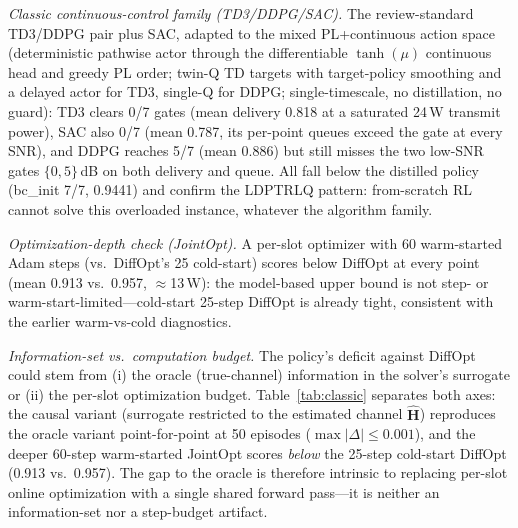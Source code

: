 \documentclass[journal]{IEEEtran}
\newcommand{\vect}[1]{\mathbf{#1}}
\begin{document}
\emph{Classic continuous-control family (TD3/DDPG/SAC).} The review-standard
TD3/DDPG pair plus SAC, adapted to the mixed PL+continuous action space
(deterministic pathwise actor through the differentiable $\tanh(\mu)$ continuous
head and greedy PL order; twin-Q TD targets with target-policy smoothing and a
delayed actor for TD3, single-Q for DDPG; single-timescale, no distillation, no
guard): TD3 clears 0/7 gates (mean delivery 0.818 at a saturated 24\,W transmit
power), SAC also 0/7 (mean 0.787, its per-point queues exceed the gate at every
SNR), and DDPG reaches 5/7 (mean 0.886) but still misses the two low-SNR gates
$\{0,5\}$\,dB on both delivery and queue. All fall below the distilled policy
(bc\_init 7/7, 0.9441) and confirm the LDPTRLQ pattern: from-scratch RL cannot
solve this overloaded instance, whatever the algorithm family.

\emph{Optimization-depth check (JointOpt).} A per-slot optimizer with 60
warm-started Adam steps (vs.\ DiffOpt's 25 cold-start) scores below DiffOpt at
every point (mean 0.913 vs.\ 0.957, $\approx$13\,W): the model-based upper bound
is not step- or warm-start-limited---cold-start 25-step DiffOpt is already tight,
consistent with the earlier warm-vs-cold diagnostics.

\emph{Information-set vs.\ computation budget.} The policy's deficit against
DiffOpt could stem from (i) the oracle (true-channel) information in the solver's
surrogate or (ii) the per-slot optimization budget. Table~\ref{tab:classic}
separates both axes: the causal variant (surrogate restricted to the estimated
channel $\hat{\vect{H}}$) reproduces the oracle variant point-for-point at 50
episodes ($\max|\Delta|\le 0.001$), and the deeper 60-step warm-started JointOpt
scores \emph{below} the 25-step cold-start DiffOpt (0.913 vs.\ 0.957). The gap to
the oracle is therefore intrinsic to replacing per-slot online optimization with
a single shared forward pass---it is neither an information-set nor a step-budget
artifact.
\end{document}
